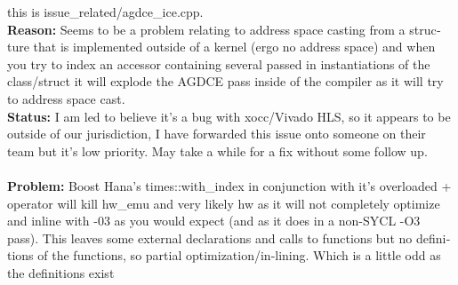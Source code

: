 \begin{otherlanguage}{english}
                                         this is issue\_related/agdce\_ice.cpp.
                                         \\
                                         \textbf{Reason:} Seems to be a problem
                                         relating to address space casting from
                                         a structure that is implemented outside
                                         of a kernel (ergo no address space) and
                                         when you try to index an accessor
                                         containing several passed in
                                         instantiations of the class/struct it
                                         will explode the AGDCE pass inside of
                                         the compiler as it will try to address
                                         space cast.
                                         \\
                                         \textbf{Status:} I am led to believe
                                         it's a bug with xocc/Vivado HLS, so it
                                         appears to be outside of our
                                         jurisdiction, I have forwarded this
                                         issue onto someone on their team but
                                         it's low priority. May take a while for
                                         a fix without some follow up.
                                         \\
                                         \\
                                         \textbf{Problem:} Boost Hana's
                                         times::with\_index in conjunction with
                                         it's overloaded + operator will kill
                                         hw\_emu and very likely hw as it will
                                         not completely optimize and inline with
                                         -03 as you would expect (and as it does
                                         in a non-SYCL -O3 pass). This leaves
                                         some external declarations and calls to
                                         functions but no definitions of the
                                         functions, so partial
                                         optimization/in-lining. Which is a
                                         little odd as the definitions exist

\end{otherlanguage}
